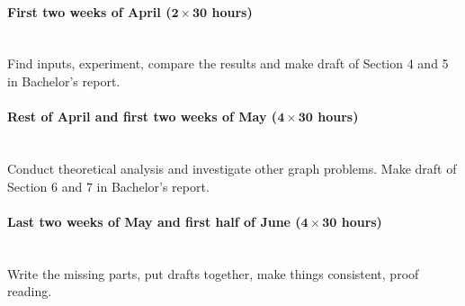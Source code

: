 \documentclass{article}
\newcommand{\timeest}[1]{$\mathbf{#1}$}%
\begin{document}
\paragraph{First two weeks of April (\timeest{2\times 30} hours)}~\\\noindent
Find inputs, experiment, compare the results and make draft of Section 4 and 5 in Bachelor's report.

\paragraph{Rest of April and first two weeks of May (\timeest{4\times 30} hours)}~\\\noindent
Conduct theoretical analysis and investigate other graph problems. Make draft of Section 6 and 7 in Bachelor's report.

\paragraph{Last two weeks of May and first half of June (\timeest{4\times 30} hours)}~\\\noindent
Write the missing parts, put drafts together, make things consistent, proof reading.
\end{document}
